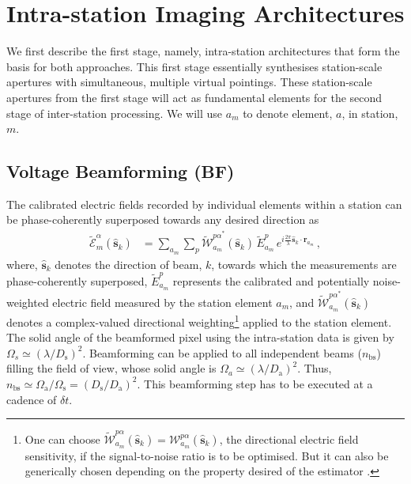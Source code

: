 \documentclass[
  journal=pasa,
  manuscript=article-type,
  year=2020,
  volume=37,
]{cup-journal}
\begin{document}
\begin{figure}
{\label{fig:hybrid-architectures-cost-schematic}}
\end{figure}

\section{Intra-station Imaging Architectures} \label{sec:intra-station-arch}

We first describe the first stage, namely, intra-station architectures that form the basis for both approaches. This first stage essentially synthesises station-scale apertures with simultaneous, multiple virtual pointings. These station-scale apertures from the first stage will act as fundamental elements for the second stage of inter-station processing. We will use $a_m$ to denote element, $a$, in station, $m$.

\subsection{Voltage Beamforming (BF)}

The calibrated electric fields recorded by individual elements within a station can be phase-coherently superposed towards any desired direction as
\begin{align}
    \widetilde{\mathcal{E}}_m^\alpha(\hat{\boldsymbol{s}}_k) &= \sum_{a_m} \sum_p  \widetilde{\mathcal{W}}_{a_m}^{{p\alpha}^*}(\hat{\boldsymbol{s}}_k) \, \widetilde{E}_{a_m}^p \, e^{i\frac{2\pi}{\lambda} \hat{\boldsymbol{s}}_k\cdot\boldsymbol{r}_{a_m}} \, , \label{eqn:intra-station-pol-hol-img-expl}
\end{align}
where, $\hat{\boldsymbol{s}}_k$ denotes the direction of beam, $k$, towards which the measurements are phase-coherently superposed, $\widetilde{E}_{a_m}^{p}$ represents the calibrated and potentially noise-weighted electric field measured by the station element $a_m$, and $\widetilde{\mathcal{W}}_{a_m}^{{p\alpha}^*}(\hat{\boldsymbol{s}}_k)$ denotes a complex-valued directional weighting\footnote{One can choose $\widetilde{\mathcal{W}}_{a_m}^{p\alpha}(\hat{\boldsymbol{s}}_k)=\mathcal{W}_{a_m}^{p\alpha}(\hat{\boldsymbol{s}}_k)$, the directional electric field sensitivity, if the signal-to-noise ratio is to be optimised. But it can also be generically chosen depending on the property desired of the estimator \cite[][]{Morales2011}.} applied to the station element. The solid angle of the beamformed pixel using the intra-station data is given by $\Omega_s \simeq (\lambda/D_\textrm{s})^2$. Beamforming can be applied to all independent beams ($n_\textrm{bs}$) filling the field of view, whose solid angle is $\Omega_a \simeq (\lambda/D_\textrm{a})^2$. Thus, $n_\textrm{bs} \simeq \Omega_\textrm{a}/\Omega_\textrm{s}=(D_\textrm{s}/D_\textrm{a})^2$. This beamforming step has to be executed at a cadence of $\delta t$. 
\end{document}
